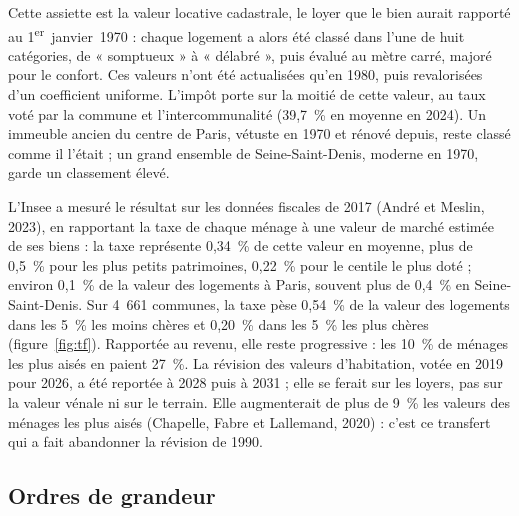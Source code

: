 \documentclass[11pt,a4paper]{article}
\begin{document}
Cette assiette est la valeur locative cadastrale, le loyer que le bien aurait rapporté au
1\textsuperscript{er}~janvier~1970 : chaque logement a alors été classé dans l'une de huit
catégories, de « somptueux » à « délabré », puis évalué au mètre carré, majoré pour le confort. Ces
valeurs n'ont été actualisées qu'en 1980, puis revalorisées d'un coefficient uniforme. L'impôt porte sur la moitié de cette valeur, au taux
voté par la commune et l'intercommunalité (39,7~\% en moyenne en 2024). Un immeuble ancien du
centre de Paris, vétuste en 1970 et rénové depuis, reste classé comme il l'était ; un grand
ensemble de Seine-Saint-Denis, moderne en 1970, garde un classement élevé.

L'Insee a mesuré le résultat sur les données fiscales de 2017 (André et Meslin, 2023), en
rapportant la taxe de chaque ménage à une valeur de marché estimée de ses biens : la taxe
représente 0,34~\% de cette valeur en moyenne, plus de 0,5~\% pour les plus petits patrimoines,
0,22~\% pour le centile le plus doté ; environ 0,1~\% de la valeur des logements à Paris, souvent
plus de 0,4~\% en Seine-Saint-Denis. Sur 4~661 communes, la taxe pèse
0,54~\% de la valeur des logements dans les 5~\% les moins chères et 0,20~\% dans les 5~\% les plus
chères (figure~\ref{fig:tf}). Rapportée au revenu, elle reste progressive : les 10~\% de ménages les
plus aisés en paient 27~\%. La révision des valeurs d'habitation, votée en 2019 pour 2026, a été
reportée à 2028 puis à 2031 ; elle se ferait sur les loyers, pas sur la valeur vénale ni sur le
terrain. Elle augmenterait de plus de 9~\% les valeurs des ménages les plus aisés (Chapelle, Fabre
et Lallemand, 2020) : c'est ce transfert qui a fait abandonner la révision de 1990.


\subsection{Ordres de grandeur}
\end{document}
